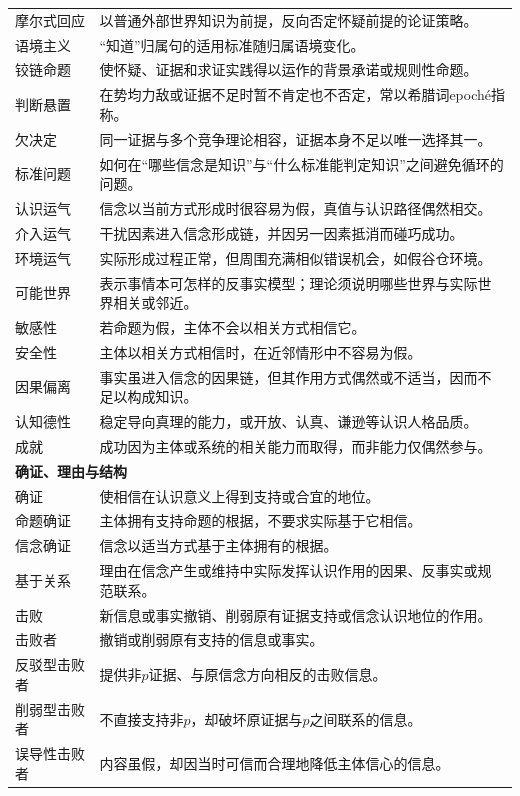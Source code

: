\begin{longtable}{p{}p{}}
摩尔式回应 & 以普通外部世界知识为前提，反向否定怀疑前提的论证策略。\\
语境主义 & “知道”归属句的适用标准随归属语境变化。\\
铰链命题 & 使怀疑、证据和求证实践得以运作的背景承诺或规则性命题。\\
判断悬置 & 在势均力敌或证据不足时暂不肯定也不否定，常以希腊词epoché指称。\\
欠决定 & 同一证据与多个竞争理论相容，证据本身不足以唯一选择其一。\\
标准问题 & 如何在“哪些信念是知识”与“什么标准能判定知识”之间避免循环的问题。\\
认识运气 & 信念以当前方式形成时很容易为假，真值与认识路径偶然相交。\\
介入运气 & 干扰因素进入信念形成链，并因另一因素抵消而碰巧成功。\\
环境运气 & 实际形成过程正常，但周围充满相似错误机会，如假谷仓环境。\\
可能世界 & 表示事情本可怎样的反事实模型；理论须说明哪些世界与实际世界相关或邻近。\\
敏感性 & 若命题为假，主体不会以相关方式相信它。\\
安全性 & 主体以相关方式相信时，在近邻情形中不容易为假。\\
因果偏离 & 事实虽进入信念的因果链，但其作用方式偶然或不适当，因而不足以构成知识。\\
认知德性 & 稳定导向真理的能力，或开放、认真、谦逊等认识人格品质。\\
成就 & 成功因为主体或系统的相关能力而取得，而非能力仅偶然参与。\\
\multicolumn{2}{l}{\textbf{确证、理由与结构}}\\
确证 & 使相信在认识意义上得到支持或合宜的地位。\\
命题确证 & 主体拥有支持命题的根据，不要求实际基于它相信。\\
信念确证 & 信念以适当方式基于主体拥有的根据。\\
基于关系 & 理由在信念产生或维持中实际发挥认识作用的因果、反事实或规范联系。\\
击败 & 新信息或事实撤销、削弱原有证据支持或信念认识地位的作用。\\
击败者 & 撤销或削弱原有支持的信息或事实。\\
反驳型击败者 & 提供非$p$证据、与原信念方向相反的击败信息。\\
削弱型击败者 & 不直接支持非$p$，却破坏原证据与$p$之间联系的信息。\\
误导性击败者 & 内容虽假，却因当时可信而合理地降低主体信心的信息。\\

\end{longtable}
